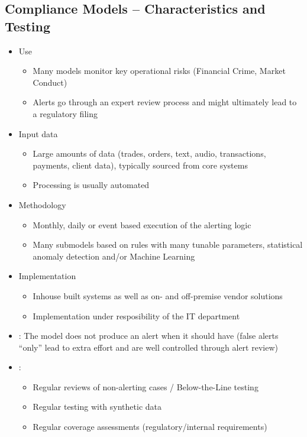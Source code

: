 \subsection*{Compliance Models – Characteristics and Testing}
\begin{itemize}[leftmargin=*]
    \item Use
    \begin{itemize}[leftmargin=*]
        \item Many models monitor key
operational risks (Financial
Crime, Market Conduct)
        \item Alerts go through an expert
review process and might
ultimately lead to a
regulatory filing
    \end{itemize}
    
    \item Input data
    \begin{itemize}[leftmargin=*]
    \item Large amounts of data
(trades, orders, text, audio,
transactions, payments,
client data), typically
sourced from core systems
    \item Processing is usually
automated
    \end{itemize}
    
    \item Methodology
    \begin{itemize}[leftmargin=*]
    \item Monthly, daily or event
based execution of the
alerting logic
    \item Many submodels based on
rules with many tunable
parameters, statistical
anomaly detection and/or
Machine Learning
    \end{itemize}
    
    
    
    
    \item Implementation
    \begin{itemize}[leftmargin=*]
    \item Inhouse built systems as
well as on- and off-premise
vendor solutions
    \item Implementation under
resposibility of the IT
department
    \end{itemize}
    
    
    \item {}: The model does not produce an alert when it should have (false alerts “only” lead to
extra effort and are well controlled through alert review)

    \item {}: 
        \begin{itemize}[leftmargin=*]
\item Regular reviews of non-alerting cases / Below-the-Line testing
\item Regular testing with synthetic data
\item Regular coverage assessments (regulatory/internal requirements)
    \end{itemize}
\end{itemize}